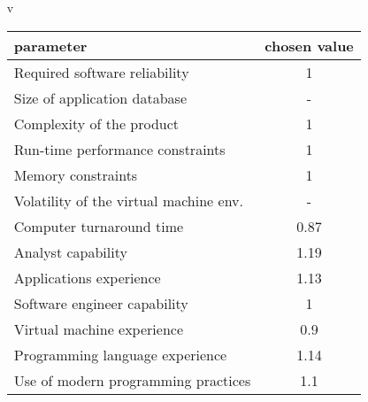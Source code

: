 \documentclass{scrartcl}
\begin{document}
\begin{itemize}
	\item[v]

	\begin{tabular}{l | c}
		parameter & chosen value \\
		\hline
		Required software reliability & 1\\
		Size of application database & -\\
		Complexity of the product & 1\\
		Run-time performance constraints  & 1\\
		Memory constraints & 1\\
		Volatility of the virtual machine env. & -\\
		Computer turnaround time & 0.87\\
		Analyst capability & 1.19\\
		Applications experience & 1.13\\
		Software engineer capability & 1\\
		Virtual machine experience & 0.9\\
		Programming language experience & 1.14\\
		Use of modern programming practices & 1.1\\

\end{tabular}
\end{itemize}
\end{document}
